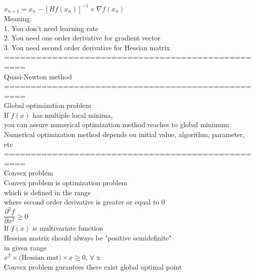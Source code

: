 \documentclass{article}
\begin{document}
${x}_{n+1} = {x}_n - [{H}f({x}_n)]^{-1} \times \nabla f({x}_n)$ \\ 

Meaning: \\ 
1. You don't need learning rate \\ 
2. You need one order derivative for gradient vector \\ 
3. You need second order derivative for Hessian matrix \\ 

==================================================\\
Quasi-Newton method \\ 

==================================================\\
Global optimization problem \\ 
If $f(x)$ has multiple local minima, \\ 
you can assure numerical optimization method reaches to global minimum \\

Numerical optimization method depends on initial value, algorithm, parameter, etc \\ 

==================================================\\
Convex problem \\ 
Convex problem is optimization problem \\
which is defined in the range\\
where second order derivative is greater or equal to 0 \\ 

$\dfrac{\partial^2 f}{\partial x^2} \ge 0$ \\

If $f(x)$ is multivariate function \\ 
Hessian matrix should always be "positive semidefinite" \\ 
in given range \\ 

$x^T \times \text{(Hessian mat)} \times x \ge 0$, $\forall$ x \\ 

Convex problem gurantees there exist global optimal point \\ 
\end{document}
